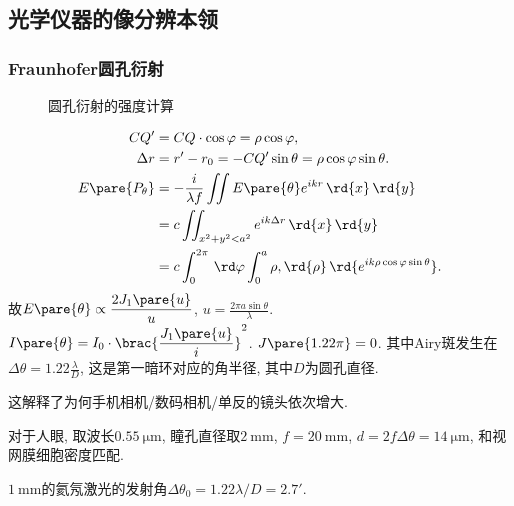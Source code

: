 \documentclass{ctexart}
\begin{document}


\subsection{光学仪器的像分辨本领} %
\label{sub:光学仪器的像分辨本领}

\subsubsection{Fraunhofer圆孔衍射} %
\label{ssub:fraunhofer圆孔衍射}

\begin{figure}[ht]
    \centering
    \caption{圆孔衍射的强度计算}
\end{figure}
\begin{align*}
    CQ' &= CQ\cdot \cos\varphi = \rho\cos\varphi, \\
    \Delta r &= r' - r_0 = - CQ'\sin\theta = \rho \cos \varphi\sin\theta. \\
    E\pare{P_\theta} &= -\frac{i}{\lambda f} \iint E\pare{\theta} e^{ikr}\,\rd{x}\,\rd{y} \\
    &= c\iint_{x^2+y^2<a^2} e^{ik\Delta r}\,\rd{x}\,\rd{y} \\
    &= c\int_0^{2\pi}\,\rd\varphi \int_0^a \rho,\rd{\rho}\,\rd{e^{ik\rho\cos\varphi\sin\theta}}.
\end{align*}
故$\displaystyle E\pare{\theta} \propto \frac{2J_1\pare{u}}{u}$, $\displaystyle u = \frac{2\pi a\sin\theta}{\lambda}$. $\displaystyle I\pare{\theta} = I_0 \cdot\brac{\frac{J_1\pare{u}}{i}}^2$. $J\pare{1.22\pi} = 0$. 
其中Airy斑发生在$\Delta \theta = \displaystyle 1.22 \frac{\lambda}{D}$, 这是第一暗环对应的角半径, 其中$D$为圆孔直径.
\begin{remark}
    这解释了为何手机相机/数码相机/单反的镜头依次增大.
\end{remark}
\begin{sample}
    \begin{ex}
        对于人眼, 取波长$\SI{0.55}{\micro\meter}$, 瞳孔直径取$\SI{2}{\milli\meter}$, $f = \SI{20}{\milli\meter}$, $\displaystyle d = 2f\Delta\theta = \SI{14}{\micro\meter}$, 和视网膜细胞密度匹配.
    \end{ex}
\end{sample}
\begin{sample}
    \begin{ex}
        $\SI{1}{\milli\meter}$的氦氖激光的发射角$\Delta\theta_0 = 1.22\lambda/D = 2.7'$.
    \end{ex}
\end{sample}
\end{document}
